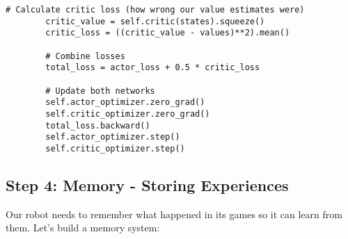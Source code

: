 \documentclass[11pt]{article}
\begin{document}
\begin{tcolorbox}[colback=cyan!5!white,colframe=cyan!75!black,title=Building the PPO Learning System,width=\textwidth]
\begin{minipage}{0.48\textwidth}
\begin{lstlisting}[style=Python,basicstyle=\ttfamily\scriptsize]
        # Calculate critic loss (how wrong our value estimates were)
        critic_value = self.critic(states).squeeze()
        critic_loss = ((critic_value - values)**2).mean()
        
        # Combine losses
        total_loss = actor_loss + 0.5 * critic_loss
        
        # Update both networks
        self.actor_optimizer.zero_grad()
        self.critic_optimizer.zero_grad()
        total_loss.backward()
        self.actor_optimizer.step()
        self.critic_optimizer.step()
\end{lstlisting}
\end{minipage}
\end{tcolorbox}

\subsection{Step 4: Memory - Storing Experiences}

Our robot needs to remember what happened in its games so it can learn from them. Let's build a memory system:
\end{document}
